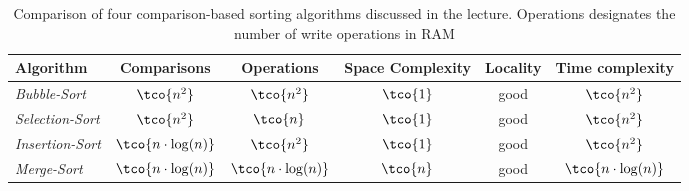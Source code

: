 \begin{table}[h!]
    \centering
    \begin{tabular}{lccccc}
        \toprule
        \textbf{Algorithm}      & \textbf{Comparisons}    & \textbf{Operations}     & \textbf{Space Complexity} & \textbf{Locality} & \textbf{Time complexity} \\
        \midrule
        \textit{Bubble-Sort}    & $\tco{n^2}$             & $\tco{n^2}$             & $\tco{1}$                 & good              & $\tco{n^2}$              \\
        \textit{Selection-Sort} & $\tco{n^2}$             & $\tco{n}$               & $\tco{1}$                 & good              & $\tco{n^2}$              \\
        \textit{Insertion-Sort} & $\tco{n \cdot \log(n)}$ & $\tco{n^2}$             & $\tco{1}$                 & good              & $\tco{n^2}$              \\
        \textit{Merge-Sort}     & $\tco{n\cdot \log(n)}$  & $\tco{n \cdot \log(n)}$ & $\tco{n}$                 & good              & $\tco{n \cdot \log(n)}$  \\
        \bottomrule
    \end{tabular}
    \caption{Comparison of four comparison-based sorting algorithms discussed in the lecture. Operations designates the number of write operations in RAM}
\end{table}


